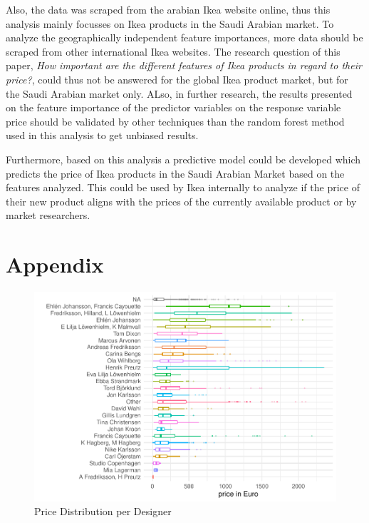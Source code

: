 \documentclass[a4paper, nobind]{templates/ociamthesis}
\begin{document}
Also, the data was scraped from the arabian Ikea website online, thus this analysis mainly focusses on Ikea products in the Saudi Arabian market. To analyze the geographically independent feature importances, more data should be scraped from other international Ikea websites. The research question of this paper, \emph{How important are the different features of Ikea products in regard to their price?}, could thus not be answered for the global Ikea product market, but for the Saudi Arabian market only. ALso, in further research, the results presented on the feature importance of the predictor variables on the response variable price should be validated by other techniques than the random forest method used in this analysis to get unbiased results.

Furthermore, based on this analysis a predictive model could be developed which predicts the price of Ikea products in the Saudi Arabian Market based on the features analyzed. This could be used by Ikea internally to analyze if the price of their new product aligns with the prices of the currently available product or by market researchers.

\startappendices

\hypertarget{appendix}{%
\chapter{Appendix}\label{appendix}}

\begin{figure}
\includegraphics[width=1\linewidth]{_main_files/figure-latex/price-dist-per-designer-1} \caption{Price Distribution per Designer}\label{fig:price-dist-per-designer}
\end{figure}
\end{document}
